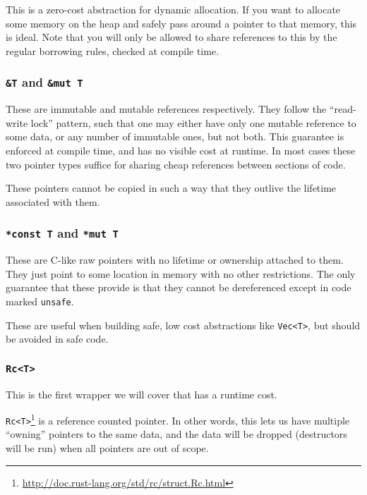\documentclass[a4paper,]{book}
\renewcommand{\href}[2]{#2\footnote{\url{#1}}}
\begin{document}
This is a zero-cost abstraction for dynamic allocation. If you want to
allocate some memory on the heap and safely pass around a pointer to
that memory, this is ideal. Note that you will only be allowed to share
references to this by the regular borrowing rules, checked at compile
time.

\subsubsection{\texorpdfstring{\texttt{\&T} and
\texttt{\&mut\ T}}{\&T and \&mut T}}\label{t-and-mut-t}

These are immutable and mutable references respectively. They follow the
``read-write lock'' pattern, such that one may either have only one
mutable reference to some data, or any number of immutable ones, but not
both. This guarantee is enforced at compile time, and has no visible
cost at runtime. In most cases these two pointer types suffice for
sharing cheap references between sections of code.

These pointers cannot be copied in such a way that they outlive the
lifetime associated with them.

\subsubsection{\texorpdfstring{\texttt{*const\ T} and
\texttt{*mut\ T}}{*const T and *mut T}}\label{const-t-and-mut-t}

These are C-like raw pointers with no lifetime or ownership attached to
them. They just point to some location in memory with no other
restrictions. The only guarantee that these provide is that they cannot
be dereferenced except in code marked \texttt{unsafe}.

These are useful when building safe, low cost abstractions like
\texttt{Vec\textless{}T\textgreater{}}, but should be avoided in safe
code.

\subsubsection{\texorpdfstring{\texttt{Rc\textless{}T\textgreater{}}}{Rc\textless{}T\textgreater{}}}\label{rct}

This is the first wrapper we will cover that has a runtime cost.

\href{http://doc.rust-lang.org/std/rc/struct.Rc.html}{\texttt{Rc\textless{}T\textgreater{}}}
is a reference counted pointer. In other words, this lets us have
multiple ``owning'' pointers to the same data, and the data will be
dropped (destructors will be run) when all pointers are out of scope.
\end{document}
